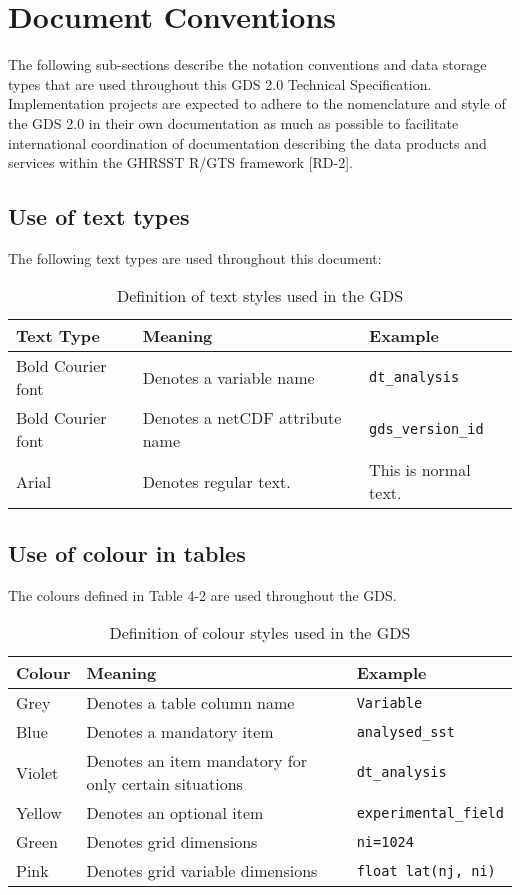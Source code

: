 \pagebreak
\section{Document Conventions}
The following sub-sections describe the notation conventions and data storage types that are used
throughout this GDS 2.0 Technical Specification. Implementation projects are expected to adhere to
the nomenclature and style of the GDS 2.0 in their own documentation as much as possible to
facilitate international coordination of documentation describing the data products and services within
the GHRSST R/GTS framework [RD-2].
\subsection{Use of text types}
The following text types are used throughout this document:
\begin{table}[h]
\centering
\caption{Definition of text styles used in the GDS}
\label{tab:table-label}
\begin{tabular}{|p{2.5cm}|>{\raggedright}p{5.5cm}|p{3cm}|}
\hline \rowcolor{lightgray}
\textbf{Text Type} & \textbf{Meaning} & \textbf{Example} \\
\hline
Bold Courier font & Denotes a variable name & \texttt{dt\_analysis} \\
\hline
Bold Courier font & Denotes a netCDF attribute name & \texttt{gds\_version\_id} \\
\hline
Arial & Denotes regular text. & This is normal text. \\
\hline
\end{tabular}
\end{table}
\subsection{Use of colour in tables}
The colours defined in Table 4-2 are used throughout the GDS.
\begin{table}[h]
\centering
\caption{Definition of colour styles used in the GDS}
\label{tab:color-styles}
\begin{tabular}{|l|l|l|}
\hline
\rowcolor{lightgray} \textbf{ Colour} & \textbf{Meaning} & \textbf{Example}\\
\hline
Grey & Denotes a table column name & \cellcolor{lightgray} \texttt{Variable}\\
\hline
Blue & Denotes a mandatory item & \cellcolor{cyan} \texttt{analysed\_sst}\\
\hline
Violet & Denotes an item mandatory for only certain situations & \cellcolor{Thistle} \texttt{dt\_analysis}\\
\hline
Yellow & Denotes an optional item & \cellcolor{Goldenrod} \texttt{experimental\_field}\\
\hline
Green & Denotes grid dimensions & \cellcolor{YellowGreen} \texttt{ni=1024}\\
\hline
Pink & Denotes grid variable dimensions & \cellcolor{Apricot} \texttt{float lat(nj, ni)}\\
\hline
\end{tabular}
\end{table}

